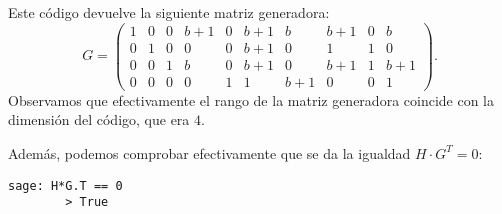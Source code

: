 \begin{exampleth}
    Este código devuelve la siguiente matriz generadora:
    \[
        G = \left(\begin{array}{rrrrrrrrrr}
        1 & 0 & 0 & b + 1 & 0 & b + 1 & b & b + 1 & 0 & b \\
        0 & 1 & 0 & 0 & 0 & b + 1 & 0 & 1 & 1 & 0 \\
        0 & 0 & 1 & b & 0 & b + 1 & 0 & b + 1 & 1 & b + 1 \\
        0 & 0 & 0 & 0 & 1 & 1 & b + 1 & 0 & 0 & 1
        \end{array}\right).
    \]
    Observamos que efectivamente el rango de la matriz generadora coincide con la dimensión del código, que era $4$.

    Además, podemos comprobar efectivamente que se da la igualdad $H \cdot G^T = 0$:

    \begin{lstlisting}[gobble=4]
        sage: H*G.T == 0
        > True
    \end{lstlisting}
\end{exampleth}

